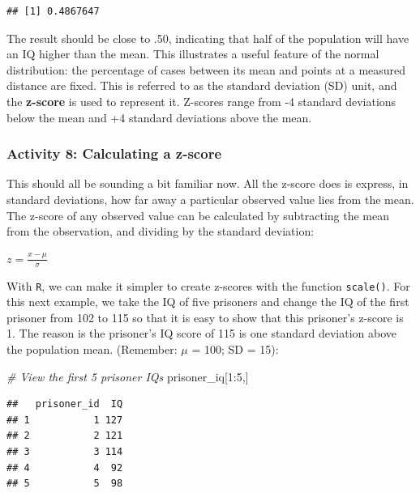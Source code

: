 \documentclass[
]{book}
\newenvironment{Shaded}{\begin{snugshade}}{\end{snugshade}}
\newcommand{\CommentTok}[1]{\textcolor[rgb]{0.56,0.35,0.01}{\textit{#1}}}
\newcommand{\DecValTok}[1]{\textcolor[rgb]{0.00,0.00,0.81}{#1}}
\newcommand{\NormalTok}[1]{#1}
\newcommand{\SpecialCharTok}[1]{\textcolor[rgb]{0.00,0.00,0.00}{#1}}
\begin{document}
\begin{verbatim}
## [1] 0.4867647
\end{verbatim}

The result should be close to .50, indicating that half of the population will have an IQ higher than the mean. This illustrates a useful feature of the normal distribution: the percentage of cases between its mean and points at a measured distance are fixed. This is referred to as the standard deviation (SD) unit, and the \textbf{z-score} is used to represent it. Z-scores range from -4 standard deviations below the mean and +4 standard deviations above the mean.

\hypertarget{activity-8-calculating-a-z-score}{%
\subsubsection{Activity 8: Calculating a z-score}\label{activity-8-calculating-a-z-score}}

This should all be sounding a bit familiar now. All the z-score does is express, in standard deviations, how far away a particular observed value lies from the mean. The z-score of any observed value can be calculated by subtracting the mean from the observation, and dividing by the standard deviation:

\(z = \frac{x - \mu}{\sigma}\)

With \texttt{R}, we can make it simpler to create z-scores with the function \texttt{scale()}. For this next example, we take the IQ of five prisoners and change the IQ of the first prisoner from 102 to 115 so that it is easy to show that this prisoner's z-score is 1. The reason is the prisoner's IQ score of 115 is one standard deviation above the population mean. (Remember: \(\mu\) = 100; SD = 15):

\begin{Shaded}
\begin{Highlighting}[]
\CommentTok{\# View the first 5 prisoner IQs}
\NormalTok{prisoner\_iq[}\DecValTok{1}\SpecialCharTok{:}\DecValTok{5}\NormalTok{,] }
\end{Highlighting}
\end{Shaded}

\begin{verbatim}
##   prisoner_id  IQ
## 1           1 127
## 2           2 121
## 3           3 114
## 4           4  92
## 5           5  98
\end{verbatim}
\end{document}
